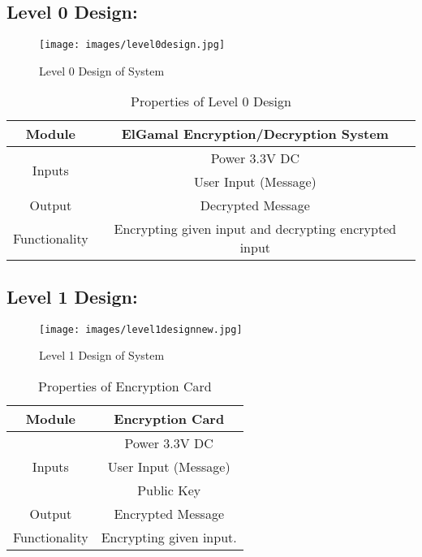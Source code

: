 \documentclass[12pt]{article}
\begin{document}
	\subsection{Level 0 Design:}
	\begin{figure}[H]
		\centering
		\label{Level 0 Design of System }
		\texttt{[image: images/level0design.jpg]}\\[0.5 cm]	
		\caption{Level 0 Design of System } 		
	\end{figure}
	\begin{table}[H]
		\centering
		
		\label{Properties Of Level 0 Design }
		\begin{tabular}{|c|c|}
			\hline
			Module & ElGamal Encryption/Decryption System \\ \hline
			\multirow{2}{*}{Inputs} & Power 3.3V DC \\ \cline{2-2}
			& User Input (Message) \\ \hline
			Output & Decrypted Message \\ \hline
			Functionality & Encrypting given input and  decrypting encrypted input \\ \hline
			
		\end{tabular}
		\caption{Properties of Level 0 Design }
	\end{table}
	
	\subsection{Level 1 Design:}
	
	\begin{figure}[H]
		\centering
		\label{Level 1 Design of System }
		\texttt{[image: images/level1designnew.jpg]}\\[0.5 cm]	
		\caption{Level 1 Design of System } 		
	\end{figure}
	
	
	\begin{table}[h]
		
		\centering
		
		\label{Properties of Encryption Card}
		\begin{tabular}{|c|c|}
			\hline
			Module & Encryption Card \\ \hline
			\multirow{3}{*}{Inputs} & Power 3.3V DC \\
			\cline{2-2}
			& User Input (Message) \\
			\cline{2-2}
			& Public Key \\ \hline
			Output & Encrypted Message \\ \hline
			Functionality & Encrypting given input.\\ \hline		
		\end{tabular}
		\caption{Properties of Encryption Card}
		
	\end{table}
	
\end{document}
